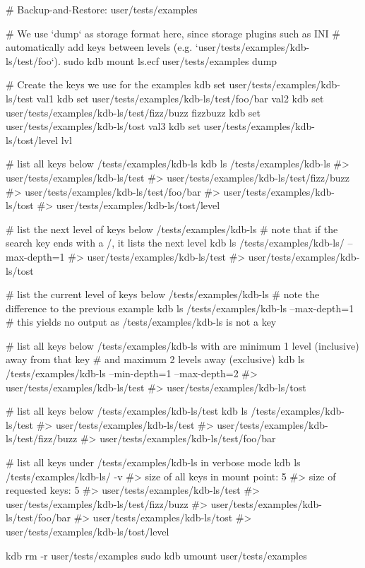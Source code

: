 \begin{DoxyCode}
# Backup-and-Restore: user/tests/examples

# We use `dump` as storage format here, since storage plugins such as INI
# automatically add keys between levels (e.g. `user/tests/examples/kdb-ls/test/foo`).
sudo kdb mount ls.ecf user/tests/examples dump

# Create the keys we use for the examples
kdb set user/tests/examples/kdb-ls/test val1
kdb set user/tests/examples/kdb-ls/test/foo/bar val2
kdb set user/tests/examples/kdb-ls/test/fizz/buzz fizzbuzz
kdb set user/tests/examples/kdb-ls/tost val3
kdb set user/tests/examples/kdb-ls/tost/level lvl

# list all keys below /tests/examples/kdb-ls
kdb ls /tests/examples/kdb-ls
#> user/tests/examples/kdb-ls/test
#> user/tests/examples/kdb-ls/test/fizz/buzz
#> user/tests/examples/kdb-ls/test/foo/bar
#> user/tests/examples/kdb-ls/tost
#> user/tests/examples/kdb-ls/tost/level

# list the next level of keys below /tests/examples/kdb-ls
# note that if the search key ends with a /, it lists the next level
kdb ls /tests/examples/kdb-ls/ --max-depth=1
#> user/tests/examples/kdb-ls/test
#> user/tests/examples/kdb-ls/tost

# list the current level of keys below /tests/examples/kdb-ls
# note the difference to the previous example
kdb ls /tests/examples/kdb-ls --max-depth=1
# this yields no output as /tests/examples/kdb-ls is not a key

# list all keys below /tests/examples/kdb-ls with are minimum 1 level (inclusive) away from that key
# and maximum 2 levels away (exclusive)
kdb ls /tests/examples/kdb-ls --min-depth=1 --max-depth=2
#> user/tests/examples/kdb-ls/test
#> user/tests/examples/kdb-ls/tost

# list all keys below /tests/examples/kdb-ls/test
kdb ls /tests/examples/kdb-ls/test
#> user/tests/examples/kdb-ls/test
#> user/tests/examples/kdb-ls/test/fizz/buzz
#> user/tests/examples/kdb-ls/test/foo/bar

# list all keys under /tests/examples/kdb-ls in verbose mode
kdb ls /tests/examples/kdb-ls/ -v
#> size of all keys in mount point: 5
#> size of requested keys: 5
#> user/tests/examples/kdb-ls/test
#> user/tests/examples/kdb-ls/test/fizz/buzz
#> user/tests/examples/kdb-ls/test/foo/bar
#> user/tests/examples/kdb-ls/tost
#> user/tests/examples/kdb-ls/tost/level

kdb rm -r user/tests/examples
sudo kdb umount user/tests/examples
\end{DoxyCode}


